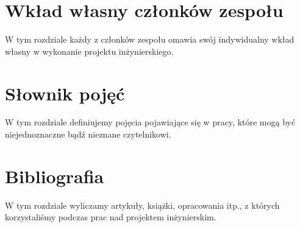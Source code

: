 \documentclass[11pt,oneside,a4paper,titlepage,onecolumn]{book}
\begin{document}

\section{Wkład własny członków zespołu}

W tym rozdziale każdy z członków zespołu omawia swój indywidualny wkład własny w wykonanie projektu
inżynierskiego.

\section{Słownik pojęć}

W tym rozdziale definiujemy pojęcia pojawiające się w pracy, które mogą być niejednoznaczne bądź nieznane
czytelnikowi.

\section{Bibliografia}

W tym rozdziale wyliczamy artykuły, książki, opracowania itp., z których korzystaliśmy podczas prac nad
projektem inżynierskim.
\end{document}
